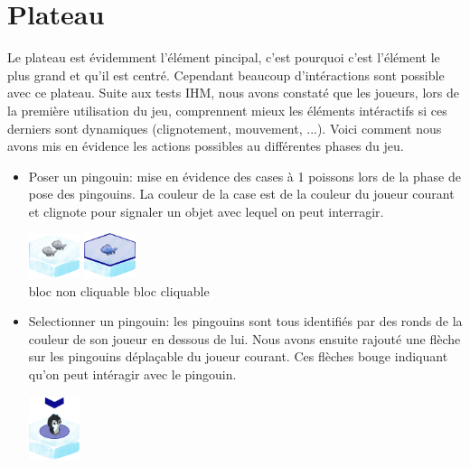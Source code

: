 \documentclass{report}
\begin{document}
\section{Plateau}
Le plateau est évidemment l'élément pincipal, c'est pourquoi c'est l'élément le plus grand et qu'il est centré. Cependant beaucoup d'intéractions sont possible avec ce plateau. Suite aux tests IHM,
nous avons constaté que les joueurs, lors de la première utilisation du jeu, comprennent mieux les éléments intéractifs si ces derniers sont dynamiques (clignotement, mouvement, ...). Voici comment nous avons mis en évidence les actions possibles au différentes phases du jeu.

\begin{itemize}
\item Poser un pingouin: mise en évidence des cases à 1 poissons lors de la phase de pose des pingouins. La couleur de la case est de la couleur du joueur courant et clignote pour signaler un objet avec lequel on peut interragir.
  \begin{center}
    
    \includegraphics[width=1.5cm]{image/bloc_simple.png}    
    \hspace{1cm}
    \includegraphics[width=1.5cm]{image/bloc_mev.png}
    \\
    bloc non cliquable \hspace{0.5cm} bloc cliquable
  \end{center}

\item Selectionner un pingouin: les pingouins sont tous identifiés par des ronds de la couleur de son joueur en dessous de lui. Nous avons ensuite rajouté une flèche sur les pingouins déplaçable du joueur courant. Ces flèches bouge indiquant qu'on peut intéragir avec le pingouin.
  \begin{center}
    \includegraphics[width=1.5cm]{image/bloc_pingouin.png}    
  \end{center}


\end{itemize}
\end{document}
